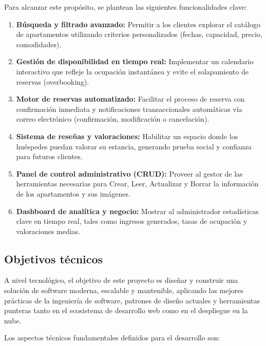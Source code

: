 Para alcanzar este propósito, se plantean las siguientes funcionalidades clave:
\begin{enumerate}
    \item \textbf{Búsqueda y filtrado avanzado:} Permitir a los clientes explorar el catálogo de apartamentos utilizando criterios personalizados (fechas, capacidad, precio, comodidades).

    \item \textbf{Gestión de disponibilidad en tiempo real:} Implementar un calendario interactivo que refleje la ocupación instantánea y evite el solapamiento de reservas (overbooking).
    
    \item \textbf{Motor de reservas automatizado:} Facilitar el proceso de reserva con confirmación inmediata y notificaciones transaccionales automáticas vía correo electrónico (confirmación, modificación o cancelación).
    
    \item \textbf{Sistema de reseñas y valoraciones:} Habilitar un espacio donde los huéspedes puedan valorar su estancia, generando prueba social y confianza para futuros clientes.
    
    \item \textbf{Panel de control administrativo (CRUD):} Proveer al gestor de las herramientas necesarias para Crear, Leer, Actualizar y Borrar la información de los apartamentos y sus imágenes.
    
    \item \textbf{Dashboard de analítica y negocio:} Mostrar al administrador estadísticas clave en tiempo real, tales como ingresos generados, tasas de ocupación y valoraciones medias.
\end{enumerate}
\subsection{Objetivos técnicos}

A nivel tecnológico, el objetivo de este proyecto es diseñar y construir una solución de software moderna, escalable y mantenible, aplicando las mejores prácticas de la ingeniería de software, patrones de diseño actuales y herramientas punteras tanto en el ecosistema de desarrollo web como en el despliegue en la nube.


Los aspectos técnicos fundamentales definidos para el desarrollo son:

